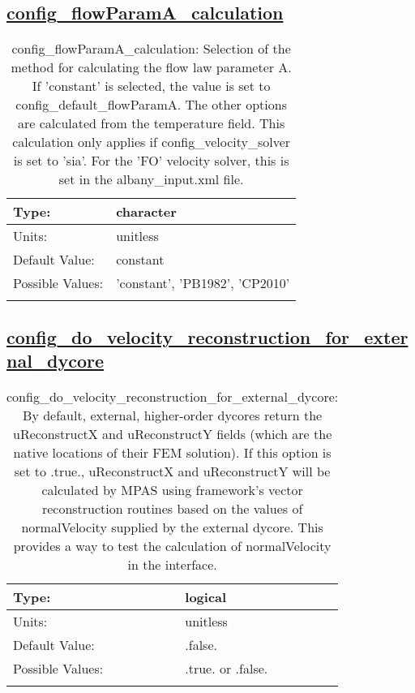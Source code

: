 \subsection[config\_flowParamA\_calculation]{\hyperref[sec:nm_tab_velocity_solver]{config\_flowParamA\_calculation}}
\label{subsec:nm_sec_config_flowParamA_calculation}
\begin{center}
\begin{longtable}{| p{2.0in} || p{4.0in} |}
    \hline
    Type: & character \\
    \hline
    Units: & \si{unitless} \\
    \hline
    Default Value: & constant \\
    \hline
    Possible Values: & 'constant', 'PB1982', 'CP2010' \\
    \hline
    \caption{config\_flowParamA\_calculation: Selection of the method for calculating the flow law parameter A.  If 'constant' is selected, the value is set to config\_default\_flowParamA.  The other options are calculated from the temperature field.  This calculation only applies if config\_velocity\_solver is set to 'sia'.  For the 'FO' velocity solver, this is set in the albany\_input.xml file.}
\end{longtable}
\end{center}
\subsection[config\_do\_velocity\_reconstruction\_for\_external\_dycore]{\hyperref[sec:nm_tab_velocity_solver]{config\_do\_velocity\_reconstruction\_for\_external\_dycore}}
\label{subsec:nm_sec_config_do_velocity_reconstruction_for_external_dycore}
\begin{center}
\begin{longtable}{| p{2.0in} || p{4.0in} |}
    \hline
    Type: & logical \\
    \hline
    Units: & \si{unitless} \\
    \hline
    Default Value: & .false. \\
    \hline
    Possible Values: & .true. or .false. \\
    \hline
    \caption{config\_do\_velocity\_reconstruction\_for\_external\_dycore: By default, external, higher-order dycores return the uReconstructX and uReconstructY fields (which are the native locations of their FEM solution).  If this option is set to .true., uReconstructX and uReconstructY will be calculated by MPAS using framework's vector reconstruction routines based on the values of normalVelocity supplied by the external dycore.  This provides a way to test the calculation of normalVelocity in the interface.}
\end{longtable}
\end{center}

